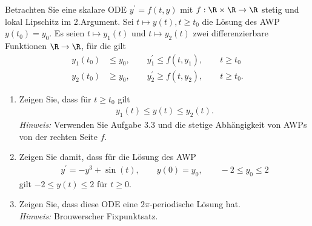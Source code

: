 \begin{exercise}
Betrachten Sie eine skalare ODE $y^{\prime} = f(t,y)$ mit $f: \R \times \R \to \R$
stetig und lokal Lipschitz im 2.Argument. Sei $t \mapsto y(t), t \geq t_0$
die Lösung des AWP $y(t_0) = y_0$. Es seien $t \mapsto y_1(t)$ und $t \mapsto y_2(t)$
zwei differenzierbare Funktionen $\R \to \R$, für die gilt
\begin{align*}
  y_1(t_0) &\leq y_0, \qquad y_1^{\prime} \leq f(t,y_1), \qquad t \geq t_0 \\
  y_2(t_0) &\geq y_0, \qquad y_2^{\prime} \geq f(t,y_2), \qquad t \geq t_0.
\end{align*}
\begin{enumerate}[label = \textbf{\alph*)}]
  \item Zeigen Sie, dass für $t \geq t_0$ gilt
  \begin{align*}
    y_1(t) \leq y(t) \leq y_2(t).
  \end{align*}
  \textit{Hinweis:} Verwenden Sie Aufgabe 3.3 und die stetige Abhängigkeit von
  AWPs von der rechten Seite $f$.
  \item Zeigen Sie damit, dass für die Lösung des AWP
  \begin{align*}
    y^{\prime} = -y^3 + \sin(t), \qquad y(0) = y_0, \qquad -2 \leq y_0 \leq 2
  \end{align*}
  gilt $-2 \leq y(t) \leq 2$ für $t \geq 0$.
  \item Zeigen Sie, dass diese ODE eine $2\pi$-periodische Lösung hat. \\
  \textit{Hinweis:} Brouwerscher Fixpunktsatz.
\end{enumerate}
\end{exercise}
